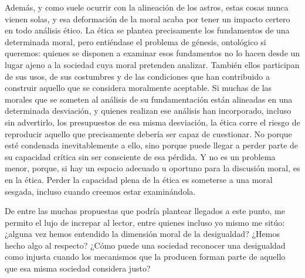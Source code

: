 \documentclass[12pt,a4paper]{article}
\begin{document}
Además, y como suele ocurrir con la alineación de los astros, estas cosas nunca vienen solas, y esa deformación de la moral acaba por tener un impacto certero en todo análisis ético. La ética se plantea precisamente los fundamentos de una determinada moral, pero entiéndase el problema de génesis, ontológico si queremos: quienes se disponen a examinar esos fundamentos no lo hacen desde un lugar ajeno a la sociedad cuya moral pretenden analizar. También ellos participan de sus usos, de sus costumbres y de las condiciones que han contribuido a construir aquello que se considera moralmente aceptable. Si muchas de las morales que se someten al análisis de su fundamentación están alineadas en una determinada desviación, y quienes realizan ese análisis han incorporado, incluso sin advertirlo, los presupuestos de esa misma desviación, la ética corre el riesgo de reproducir aquello que precisamente debería ser capaz de cuestionar. No porque esté condenada inevitablemente a ello, sino porque puede llegar a perder parte de su capacidad crítica sin ser consciente de esa pérdida. Y no es un problema menor, porque, si hay un espacio adecuado u oportuno para la discusión moral, es en la ética. Perder la capacidad plena de la ética es someterse a una moral sesgada, incluso cuando creemos estar examinándola.

De entre las muchas propuestas que podría plantear llegados a este punto, me permito el lujo de increpar al lector, entre quienes incluso yo mismo me sitúo: ¿alguna vez hemos entendido la dimensión moral de la desigualdad? ¿Hemos hecho algo al respecto? ¿Cómo puede una sociedad reconocer una desigualdad como injusta cuando los mecanismos que la producen forman parte de aquello que esa misma sociedad considera justo?
\end{document}
